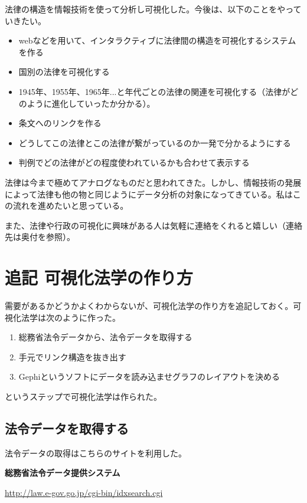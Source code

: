 \documentclass[a5j,openany,twoside]{jsbook}
\begin{document}
法律の構造を情報技術を使って分析し可視化した。今後は、以下のことをやっていきたい。

\begin{itemize}
\item webなどを用いて、インタラクティブに法律間の構造を可視化するシステムを作る
\item  国別の法律を可視化する
\item 1945年、1955年、1965年...と年代ごとの法律の関連を可視化する（法律がどのように進化していったか分かる）。
\item 条文へのリンクを作る
\item どうしてこの法律とこの法律が繋がっているのか一発で分かるようにする
\item 判例でどの法律がどの程度使われているかも合わせて表示する
\end{itemize}

法律は今まで極めてアナログなものだと思われてきた。しかし、情報技術の発展によって法律も他の物と同じようにデータ分析の対象になってきている。私はこの流れを進めたいと思っている。

また、法律や行政の可視化に興味がある人は気軽に連絡をくれると嬉しい（連絡先は奥付を参照）。

\chapter{追記 可視化法学の作り方}

需要があるかどうかよくわからないが、可視化法学の作り方を追記しておく。可視化法学は次のように作った。


\begin{enumerate}
 \item 総務省法令データから、法令データを取得する
 \item 手元でリンク構造を抜き出す
 \item Gephiというソフトにデータを読み込ませグラフのレイアウトを決める
\end{enumerate}

というステップで可視化法学は作られた。

\section{法令データを取得する}

法令データの取得はこちらのサイトを利用した。

\textbf{総務省法令データ提供システム}

\url{http://law.e-gov.go.jp/cgi-bin/idxsearch.cgi}
\end{document}
